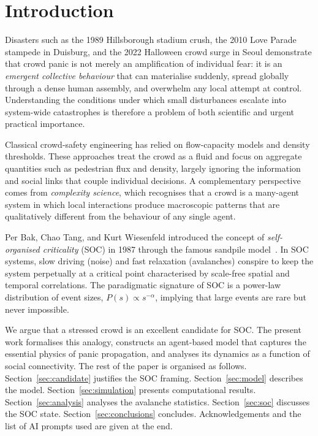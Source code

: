 \documentclass[12pt, a4paper]{article}
\begin{document}
\section{Introduction}
\label{sec:intro}

Disasters such as the 1989 Hillsborough stadium crush, the 2010 Love Parade
stampede in Duisburg, and the 2022 Halloween crowd surge in Seoul demonstrate
that crowd panic is not merely an amplification of individual fear: it is an
\emph{emergent collective behaviour} that can materialise suddenly, spread
globally through a dense human assembly, and overwhelm any local attempt at
control.  Understanding the conditions under which small disturbances escalate
into system-wide catastrophes is therefore a problem of both scientific and urgent
practical importance.

Classical crowd-safety engineering has relied on flow-capacity models and density
thresholds.  These approaches treat the crowd as a fluid and focus on aggregate
quantities such as pedestrian flux and density, largely ignoring the information
and social links that couple individual decisions.  A complementary perspective
comes from \emph{complexity science}, which recognises that a crowd is a
many-agent system in which local interactions produce macroscopic patterns that
are qualitatively different from the behaviour of any single agent.

Per Bak, Chao Tang, and Kurt Wiesenfeld introduced the concept of
\emph{self-organised criticality} (SOC) in 1987 through the famous sandpile
model~\cite{bak1987}.  In SOC systems, slow driving (noise) and fast relaxation
(avalanches) conspire to keep the system perpetually at a critical point
characterised by scale-free spatial and temporal correlations.  The paradigmatic
signature of SOC is a power-law distribution of event sizes, $P(s)\propto
s^{-\alpha}$, implying that large events are rare but never impossible.

We argue that a stressed crowd is an excellent candidate for SOC.  The present
work formalises this analogy, constructs an agent-based model that captures the
essential physics of panic propagation, and analyses its dynamics as a function of
social connectivity.  The rest of the paper is organised as follows.
Section~\ref{sec:candidate} justifies the SOC framing.
Section~\ref{sec:model} describes the model.
Section~\ref{sec:simulation} presents computational results.
Section~\ref{sec:analysis} analyses the avalanche statistics.
Section~\ref{sec:soc} discusses the SOC state.
Section~\ref{sec:conclusions} concludes.
Acknowledgements and the list of AI prompts used are given at the end.
\end{document}
